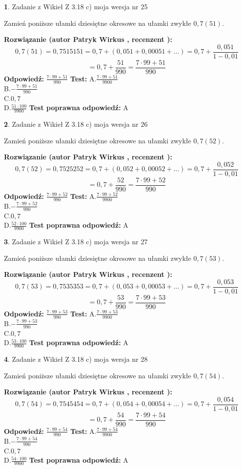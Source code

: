 \documentclass[12pt, a4paper]{article}
\theoremstyle{definition} %
\newtheorem{zad}{}
\newcommand{\zadStart}[1]{\begin{zad}#1\newline}
\newcommand{\zadStop}{\end{zad}}
\newcommand{\rozwStart}[2]{\noindent \textbf{Rozwiązanie (autor #1 , recenzent #2): }\newline}
\newcommand{\rozwStop}{\newline}
\newcommand{\odpStart}{\noindent \textbf{Odpowiedź:}\newline}
\newcommand{\odpStop}{\newline}
\newcommand{\testStart}{\noindent \textbf{Test:}\newline}
\newcommand{\testStop}{\newline}
\newcommand{\kluczStart}{\noindent \textbf{Test poprawna odpowiedź:}\newline}
\newcommand{\kluczStop}{\newline}
\begin{document}
\zadStart{Zadanie z Wikieł Z 3.18 c) moja wersja nr 25}

Zamień poniższe ułamki dziesiętne okresowe na ułamki zwykłe $0,7(51)$.
\zadStop
\rozwStart{Patryk Wirkus}{}
$$0,7(51)=0,7515151=0,7+(0,051+0,00051+...)=0,7+\frac{0,051}{1-0,01}$$
$$=0,7+\frac{51}{990}=\frac{7\cdot99+51}{990}$$
\rozwStop
\odpStart
$\frac{7\cdot99+51}{990}$
\odpStop
\testStart
A.$\frac{7\cdot99+51}{9900}$\\ B.$-\frac{7\cdot99+51}{990}$\\ C.$0,7$\\ D.$\frac{51\cdot100}{9900}$
\testStop
\kluczStart
A
\kluczStop



\zadStart{Zadanie z Wikieł Z 3.18 c) moja wersja nr 26}

Zamień poniższe ułamki dziesiętne okresowe na ułamki zwykłe $0,7(52)$.
\zadStop
\rozwStart{Patryk Wirkus}{}
$$0,7(52)=0,7525252=0,7+(0,052+0,00052+...)=0,7+\frac{0,052}{1-0,01}$$
$$=0,7+\frac{52}{990}=\frac{7\cdot99+52}{990}$$
\rozwStop
\odpStart
$\frac{7\cdot99+52}{990}$
\odpStop
\testStart
A.$\frac{7\cdot99+52}{9900}$\\ B.$-\frac{7\cdot99+52}{990}$\\ C.$0,7$\\ D.$\frac{52\cdot100}{9900}$
\testStop
\kluczStart
A
\kluczStop



\zadStart{Zadanie z Wikieł Z 3.18 c) moja wersja nr 27}

Zamień poniższe ułamki dziesiętne okresowe na ułamki zwykłe $0,7(53)$.
\zadStop
\rozwStart{Patryk Wirkus}{}
$$0,7(53)=0,7535353=0,7+(0,053+0,00053+...)=0,7+\frac{0,053}{1-0,01}$$
$$=0,7+\frac{53}{990}=\frac{7\cdot99+53}{990}$$
\rozwStop
\odpStart
$\frac{7\cdot99+53}{990}$
\odpStop
\testStart
A.$\frac{7\cdot99+53}{9900}$\\ B.$-\frac{7\cdot99+53}{990}$\\ C.$0,7$\\ D.$\frac{53\cdot100}{9900}$
\testStop
\kluczStart
A
\kluczStop



\zadStart{Zadanie z Wikieł Z 3.18 c) moja wersja nr 28}

Zamień poniższe ułamki dziesiętne okresowe na ułamki zwykłe $0,7(54)$.
\zadStop
\rozwStart{Patryk Wirkus}{}
$$0,7(54)=0,7545454=0,7+(0,054+0,00054+...)=0,7+\frac{0,054}{1-0,01}$$
$$=0,7+\frac{54}{990}=\frac{7\cdot99+54}{990}$$
\rozwStop
\odpStart
$\frac{7\cdot99+54}{990}$
\odpStop
\testStart
A.$\frac{7\cdot99+54}{9900}$\\ B.$-\frac{7\cdot99+54}{990}$\\ C.$0,7$\\ D.$\frac{54\cdot100}{9900}$
\testStop
\kluczStart
A
\kluczStop
\end{document}
